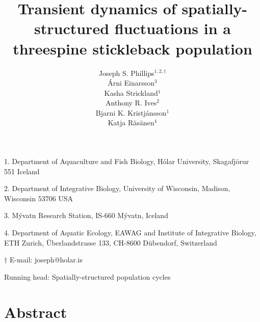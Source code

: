 \documentclass[11pt]{article}
\title{Transient dynamics of spatially-structured fluctuations 
in a threespine stickleback population}
\author{
Joseph S. Phillips$^{1,2, \dagger}$ \\
\'{A}rni Einarsson$^{3}$ \\ 
Kasha Strickland$^{1}$ \\
Anthony R. Ives$^{2}$ \\
Bjarni K. Kristj\'{a}nsson$^{1}$ \\
Katja R\"{a}s\"{a}nen$^{4}$ 
}
\date{}
\begin{document}
\raggedright
\setlength\parindent{0.25in}

\maketitle


\noindent{} 1. Department of Aquaculture and Fish Biology, 
H\'{o}lar University, Skagafj\"{o}r{\dh}ur 551 Iceland

\noindent{} 2. Department of Integrative Biology, 
University of Wisconsin, Madison, Wisconsin 53706 USA

\noindent{} 3. M\'{y}vatn Research Station, IS-660 M\'{y}vatn, Iceland

\noindent{} 4. Department of Aquatic Ecology, EAWAG and 
Institute of Integrative Biology, ETH Zurich, 
\"{U}berlandstrasse 133, CH-8600 D\"{u}bendorf, Switzerland

\noindent{} $\dagger$ E-mail: joseph@holar.is



\bigskip

Running head: {Spatially-structured population cycles}

\linenumbers{}

\clearpage






\section*{Abstract} \label{abstract}
\end{document}
